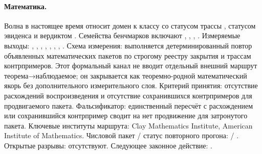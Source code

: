 \paragraph{Математика.}
Волна  в настоящее время относит домен к классу  со статусом трассы , статусом эвиденса  и вердиктом .
Семейства бенчмарков включают , \allowbreak {}, \allowbreak {}, \allowbreak {}.
Измеряемые выходы: , \allowbreak {}, \allowbreak {}, \allowbreak {}, \allowbreak {}, \allowbreak {}, \allowbreak {}, \allowbreak {}.
Схема измерения: выполняется детерминированный повтор объявленных математических пакетов по строгому реестру закрытия и трассам контрпримеров.
Этот формальный канал не вводит отдельный внешний маршрут теорема→наблюдаемое; он закрывается как теоремно-родной математический якорь без дополнительного измерительного слоя.
Критерий принятия: отсутствие расхождений воспроизведения и отсутствие сохранившихся контрпримеров для продвигаемого пакета.
Фальсификатор: единственный пересчёт с расхождением или сохранившийся контрпример сводит на нет продвижение для затронутого пакета.
Ключевые институты маршрута: Clay Mathematics Institute, \allowbreak American Institute of Mathematics.
Числовой пакет / статус повторного прогона:  / .
Открытые разрывы: отсутствуют.
Следующее законное действие: .

